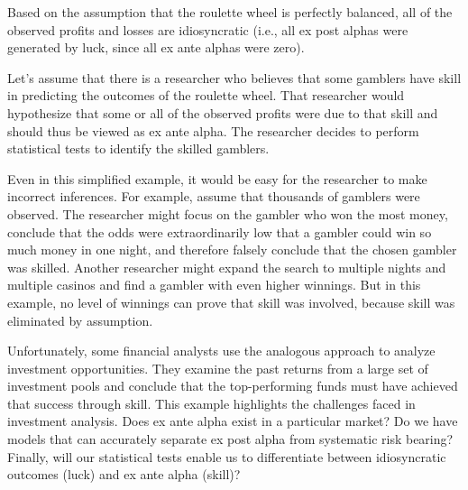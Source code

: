 \documentclass[11pt]{article}
\begin{document}
Based on the assumption that the roulette wheel is perfectly balanced, all of the observed profits and losses are idiosyncratic (i.e., all ex post alphas were generated by luck, since all ex ante alphas were zero).

Let's assume that there is a researcher who believes that some gamblers have skill in predicting the outcomes of the roulette wheel. That researcher would hypothesize that some or all of the observed profits were due to that skill and should thus be viewed as ex ante alpha. The researcher decides to perform statistical tests to identify the skilled gamblers.

Even in this simplified example, it would be easy for the researcher to make incorrect inferences. For example, assume that thousands of gamblers were observed. The researcher might focus on the gambler who won the most money, conclude that the odds were extraordinarily low that a gambler could win so much money in one night, and therefore falsely conclude that the chosen gambler was skilled. Another researcher might expand the search to multiple nights and multiple casinos and find a gambler with even higher winnings. But in this example, no level of winnings can prove that skill was involved, because skill was eliminated by assumption.

Unfortunately, some financial analysts use the analogous approach to analyze investment opportunities. They examine the past returns from a large set of investment pools and conclude that the top-performing funds must have achieved that success through skill. This example highlights the challenges faced in investment analysis. Does ex ante alpha exist in a particular market? Do we have models that can accurately separate ex post alpha from systematic risk bearing? Finally, will our statistical tests enable us to differentiate between idiosyncratic outcomes (luck) and ex ante alpha (skill)?
\end{document}
